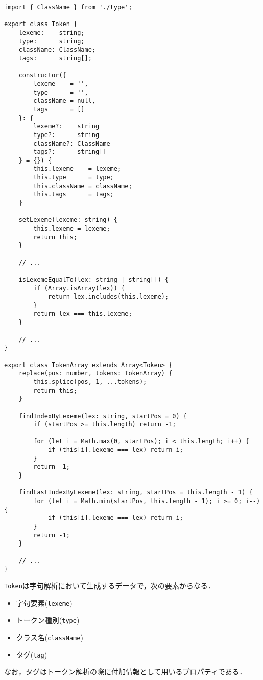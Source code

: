 \documentclass[autodetect-engine,dvi=dvipdfmx,ja=standard,
               a4j,11pt]{bxjsarticle}
\begin{document}
\begin{lstlisting}[caption={{\tt Token, TokenArray}}, label={prog:token}]
import { ClassName } from './type';

export class Token {
    lexeme:    string;
    type:      string;
    className: ClassName;
    tags:      string[];

    constructor({
        lexeme    = '',
        type      = '',
        className = null,
        tags      = [] 
    }: {
        lexeme?:    string
        type?:      string
        className?: ClassName
        tags?:      string[]
    } = {}) {
        this.lexeme    = lexeme;
        this.type      = type;
        this.className = className;
        this.tags      = tags;
    }

    setLexeme(lexeme: string) {
        this.lexeme = lexeme;
        return this;
    }

    // ...

    isLexemeEqualTo(lex: string | string[]) {
        if (Array.isArray(lex)) {
            return lex.includes(this.lexeme);
        }
        return lex === this.lexeme;
    }

    // ...
}

export class TokenArray extends Array<Token> {
    replace(pos: number, tokens: TokenArray) {
        this.splice(pos, 1, ...tokens);
        return this;
    }

    findIndexByLexeme(lex: string, startPos = 0) {
        if (startPos >= this.length) return -1;

        for (let i = Math.max(0, startPos); i < this.length; i++) {
            if (this[i].lexeme === lex) return i;
        }
        return -1;
    }

    findLastIndexByLexeme(lex: string, startPos = this.length - 1) {
        for (let i = Math.min(startPos, this.length - 1); i >= 0; i--) {
            if (this[i].lexeme === lex) return i;
        }
        return -1;
    }

    // ...
}
\end{lstlisting}

\verb|Token|は字句解析において生成するデータで，次の要素からなる．
\begin{itemize}
    \item 字句要素(\verb|lexeme|)
    \item トークン種別(\verb|type|)
    \item クラス名(\verb|className|)
    \item タグ(\verb|tag|)
\end{itemize}
%
なお，タグはトークン解析の際に付加情報として用いるプロパティである．
\end{document}
